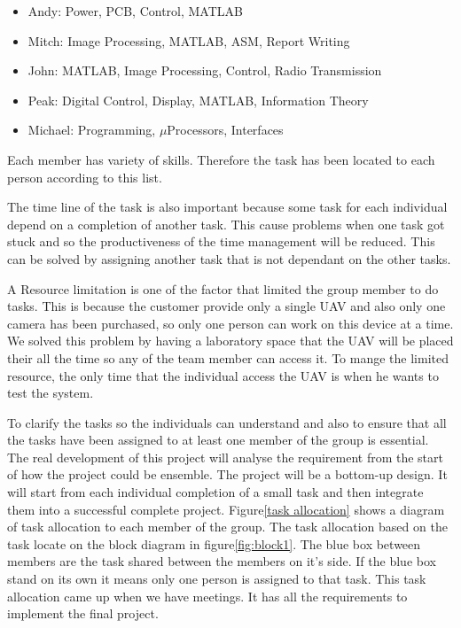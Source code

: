 \begin{itemize}
\item Andy: Power, PCB, Control, MATLAB
\item Mitch: Image Processing, MATLAB, ASM, Report Writing
\item John: MATLAB, Image Processing, Control, Radio Transmission
\item Peak: Digital Control, Display, MATLAB, Information Theory
\item Michael: Programming, $\mu$Processors, Interfaces
\end{itemize}

Each member has variety of skills. Therefore the task has been located to each person according to this list.

The time line of the task is also important because some task for each individual depend on a completion of another task. This cause problems when one task got stuck and so the productiveness of the time management will be reduced. This can be solved by assigning another task that is not dependant on the other tasks. 

A Resource limitation is one of the factor that limited the group member to do tasks. This is because the customer provide only a single UAV and also only one camera has been purchased, so only one person can work on this device at a time. We solved this problem by having a laboratory space that the UAV will be placed their all the time so any of the team member can access it. To mange the limited resource, the only time that the individual access the UAV is when he wants to test the system. 

To clarify the tasks so the individuals can understand and also to ensure that all the tasks have been assigned to at least one member of the group is essential. 
The real development of this project will analyse the requirement from the start of how the project could be ensemble. The project will be a bottom-up design. It will start from each individual completion of a small task and then integrate them into a successful complete project. 
Figure\ref{task allocation} shows a diagram of task allocation to each member of the group. 
The task allocation based on the task locate on the block diagram in figure\ref{fig:block1}.
The blue box between members are the task shared between the members on it's side. 
If the blue box stand on its own it means only one person is assigned to that task.
This task allocation came up when we have meetings.
It has all the requirements to implement the final project.

